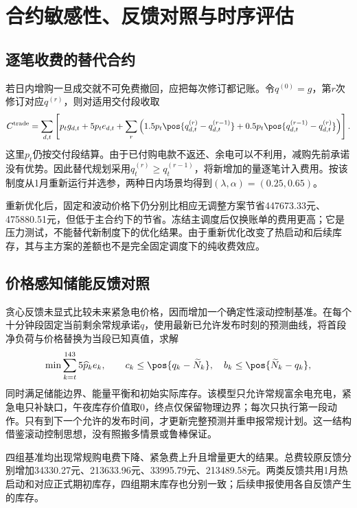 \section{合约敏感性、反馈对照与时序评估}
\subsection{逐笔收费的替代合约}
若日内增购一旦成交就不可免费撤回，应把每次修订都记账。令$q^{(0)}=g$，第$r$次修订对应$q^{(r)}$，则对适用交付段收取
\begin{equation}
 C^{\mathrm{trade}}=\sum_{d,t}\left[p_tg_{d,t}+5p_te_{d,t}
  +\sum_r\left(1.5p_t\pos{q^{(r)}_{d,t}-q^{(r-1)}_{d,t}}
  +0.5p_t\pos{q^{(r-1)}_{d,t}-q^{(r)}_{d,t}}\right)\right].
\end{equation}
这里$p_t$仍按交付段结算。由于已付购电款不返还、余电可以不利用，减购先前承诺没有优势。因此替代规划采用$q^{(r)}_t\ge q^{(r-1)}_t$，将新增加的量逐笔计入费用。按该制度从1月重新运行并选参，两种日内场景均得到$(\lambda,\alpha)=(0.25,0.65)$。


重新优化后，固定和波动价格下仍分别比相应无调整方案节省447673.33元、475880.51元，但低于主合约下的节省。冻结主调度后仅换账单的费用更高；它是压力测试，不能替代新制度下的优化结果。由于重新优化改变了热启动和后续库存，其与主方案的差额也不是完全固定调度下的纯收费效应。

\subsection{价格感知储能反馈对照}\label{sec:feedback}
贪心反馈未显式比较未来紧急电价格，因而增加一个确定性滚动控制基准。在每个十分钟段固定当前剩余常规承诺$q$，使用最新已允许发布时刻的预测曲线，将首段净负荷与价格替换为当段已知真值，求解
\begin{equation}
 \min\sum_{k=t}^{143}5\widehat p_k e_k,\qquad
 c_k\le\pos{q_k-\widetilde N_k},\quad b_k\le\pos{\widetilde N_k-q_k},
\end{equation}
同时满足储能边界、能量平衡和初始实际库存。该模型只允许常规富余电充电，紧急电只补缺口，午夜库存价值取0，终点仅保留物理边界；每次只执行第一段动作。只有到下一个允许的发布时间，才更新完整预测并重申报常规计划。这一结构借鉴滚动控制思想\cite{wytock2017dem}，没有照搬多情景或鲁棒保证。


四组基准均出现常规购电费下降、紧急费上升且增量更大的结果。总费较原反馈分别增加34330.27元、213633.96元、33995.79元、213489.58元。两类反馈共用1月热启动和对应正式期初库存，四组期末库存也分别一致；后续申报使用各自反馈产生的库存。

